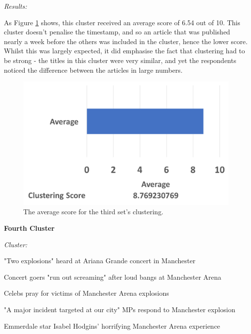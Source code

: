 \documentclass[12pt]{article}
\begin{document}
\emph{Results:}

As Figure \ref{cluster3} shows, this cluster received an average score of 6.54 out of 10. This cluster doesn't penalise the timestamp, and so an article that was published nearly a week before the others was included in the cluster, hence the lower score. Whilst this was largely expected, it did emphasise the fact that clustering had to be strong - the titles in this cluster were very similar, and yet the respondents noticed the difference between the articles in large numbers. \\

\begin{figure}[ht!]
  \centering
    \includegraphics[scale=0.6]{cluster3score.png}
   \caption[The average score for a cluster]{The average score for the third set's clustering.}
   \label{cluster3}
\end{figure} 

\textbf{Fourth Cluster}

\begin{mdframed}

\emph{Cluster:}

"Two explosions" heard at Ariana Grande concert in Manchester \cite{ag1}

Concert goers "run out screaming" after loud bangs at Manchester Arena \cite{ag2}

Celebs pray for victims of Manchester Arena explosions \cite{ag3}

"A major incident targeted at our city" MPs respond to Manchester explosion \cite{ag4}

Emmerdale star Isabel Hodgins' horrifying Manchester Arena experience \cite{ag5} \\

\end{mdframed}
\end{document}
